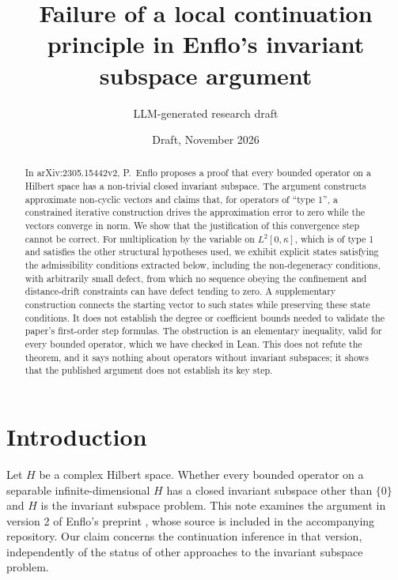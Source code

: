 \documentclass[11pt]{article}
\title{Failure of a local continuation principle in Enflo's
invariant subspace argument}
\author{LLM-generated research draft}
\date{Draft, November 2026}
\theoremstyle{definition}
\begin{document}
\maketitle


\begin{abstract}
In arXiv:2305.15442v2, P.~Enflo proposes a proof that every bounded operator on a Hilbert space
has a non-trivial closed invariant subspace. The argument constructs approximate non-cyclic
vectors and claims that, for operators of ``type 1'', a constrained iterative construction
drives the approximation error to zero while the vectors converge in norm. We show that the
justification of this convergence step cannot be correct. For multiplication by the variable on
$L^2[0,\kappa]$, which is of type 1 and satisfies the other structural hypotheses used, we
exhibit explicit states satisfying the admissibility conditions extracted below, including
the non-degeneracy conditions, with arbitrarily small defect, from which no sequence obeying
the confinement and distance-drift constraints can have defect tending to zero. A supplementary
construction connects the starting vector to such states while preserving these state
conditions. It does not establish the degree or coefficient bounds needed to validate the
paper's first-order step formulas.
The obstruction is an elementary inequality, valid for every bounded operator, which we have
checked in Lean. This does not refute the theorem, and it says nothing about operators without
invariant subspaces; it shows that the published argument does not establish its key step.
\end{abstract}

\section{Introduction}

Let $H$ be a complex Hilbert space. Whether every bounded operator on a separable
infinite-dimensional $H$ has a closed invariant subspace other than $\{0\}$ and $H$ is the
invariant subspace problem. This note examines the argument in version 2 of Enflo's
preprint \cite{E}, whose source is included in the accompanying repository. Our claim concerns
the continuation inference in that version, independently of the status of other approaches
to the invariant subspace problem.
\end{document}
